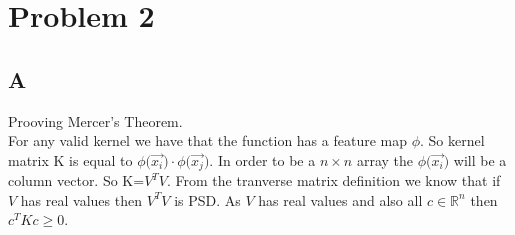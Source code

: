 \section{Problem 2}
\subsection{A}
Prooving Mercer's Theorem.\\
For any valid kernel we have that the function has a feature map $\phi$.
So kernel matrix K is equal to $\phi\big( \overrightarrow{x_i}\big) \cdot \phi\big( \overrightarrow{x_j}\big)$.
In order to be a $n\times n$ array the $\phi\big( \overrightarrow{x_i}\big)$ will be a column vector.
So K=$V^TV$. From the tranverse matrix definition we know that if $V$ has real values then $V^TV$ is 
PSD. As $V$ has real values and also all $c \in \mathbb{R}^n$ then $c^TKc \geq 0$.

